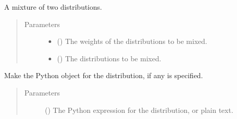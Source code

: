 \documentclass[letterpaper,10pt,english]{sphinxmanual}
\begin{document}
\begin{fulllineitems}
\label{\detokenize{tyche:tyche.Distributions.mixture}}
A mixture of two distributions.
\begin{quote}\begin{description}
\item[{Parameters}] \leavevmode\begin{itemize}
\item {} 
 () \textendash{} The weights of the distributions to be mixed.

\item {} 
 () \textendash{} The distributions to be mixed.

\end{itemize}

\end{description}\end{quote}

\end{fulllineitems}


\begin{fulllineitems}
\label{\detokenize{tyche:tyche.Distributions.parse_distribution}}
Make the Python object for the distribution, if any is specified.
\begin{quote}\begin{description}
\item[{Parameters}] \leavevmode
{} () \textendash{} The Python expression for the distribution, or plain text.

\end{description}\end{quote}

\end{fulllineitems}
\end{document}
